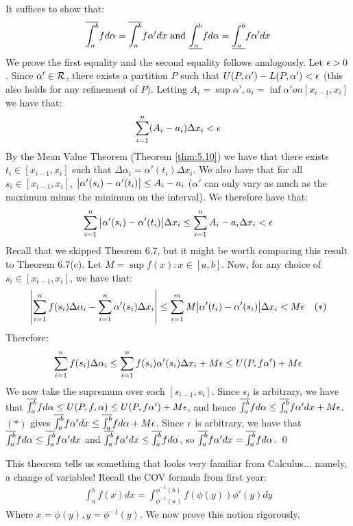 \begin{nproof}
    It suffices to show that:
    \begin{align*}
        \overline{\int_{a}^{b}} f d\alpha = \overline{\int_{a}^{b}} f\alpha'dx \text{ and } \underline{\int_{a}^{b}}fd\alpha = \underline{\int_{a}^{b}}f\alpha' dx
    \end{align*}
    We prove the first equality and the second equality follows analogously. Let $\epsilon > 0$. Since $\alpha' \in \mathcal{R}$, there exists a partition $P$ such that $U(P, \alpha') - L(P, \alpha') < \epsilon$ (this also holds for any refinement of $P$). Letting $A_i = \sup \alpha', a_i = \inf \alpha' on [x_{i-1}, x_i]$ we have that:
    \begin{align*}
        \sum_{i=1}^n(A_i - a_i) \Delta x_i < \epsilon
    \end{align*}
    By the Mean Value Theorem (Theorem \ref{thm:5.10}) we have that there exists $t_i \in [x_{i-1}, x_i]$ such that $\Delta \alpha_i = \alpha'(t_i)\Delta x_i$. We also have that for all $s_i \in [x_{i-1}, x_i]$, $\abs{\alpha'(s_i) - \alpha'(t_i)} \leq A_i - a_i$ ($\alpha'$ can only vary as much as the maximum minus the minimum on the interval). We therefore have that:
    \begin{align*}
        \sum_{i=1}^n \abs{\alpha'(s_i) - \alpha'(t_i)}\Delta x_i \leq \sum_{i=1}^n A_i - a_i\Delta x_i < \epsilon
    \end{align*}
    Recall that we skipped Theorem 6.7, but it might be worth comparing this result to Theorem 6.7(c). Let $M = \sup{f(x): x \in [a, b]}$. Now, for any choice of $s_i \in [x_{i-1}, x_i]$, we have that:
    \begin{align*}
        \abs{\sum_{i=1}^n f(s_i)\Delta\alpha_i - \sum_{i=1}^n \alpha'(s_i)\Delta x_i} \leq \sum_{i=1}^m M\abs{\alpha'(t_i) - \alpha'(s_i)}\Delta x_i < M\epsilon \quad (*)
    \end{align*}
    Therefore:
    \begin{align*}
        \sum_{i=1}^n f(s_i) \Delta \alpha_i \leq \sum_{i=1}^n f(s_i)\alpha'(s_i)\Delta x_i + M\epsilon \leq U(P, f\alpha') + M\epsilon
    \end{align*}
    We now take the supremum over each $[s_{i-1}, s_i]$. Since $s_i$ is arbitrary, we have that $\overline{\int_{a}^{b}}fd\alpha \leq U(P, f, \alpha) \leq U(P, f\alpha') + M\epsilon$, and hence $\overline{\int_{a}^{b}}f d\alpha \leq \overline{\int_{a}^{b}}f\alpha' dx + M\epsilon$. $(*)$ gives $\overline{\int_{a}^{b}}f\alpha' dx \leq \overline{\int_{a}^{b}}fd\alpha + M\epsilon$. Since $\epsilon$ is arbitrary, we have that $\overline{\int_{a}^{b}}fd\alpha \leq \overline{\int_{a}^{b}}f\alpha'dx$ and $\overline{\int_{a}^{b}}f\alpha'dx \leq \overline{\int_{a}^{b}}fd\alpha$, so $\overline{\int_{a}^{b}}f\alpha'dx = \overline{\int_{a}^{b}}fd\alpha$. \qed
\end{nproof}
\noindent This theorem tells us something that looks very familiar from Calculus... namely, a change of variables! Recall the COV formula from first year:
\begin{align*}
    \int_a^b f(x)dx = \int_{\phi^{-1}(a)}^{\phi^{-1}(b)} f(\phi(y))\phi'(y)dy
\end{align*}
Where $x = \phi(y), y = \phi^{-1}(y)$. We now prove this notion rigorously. 

